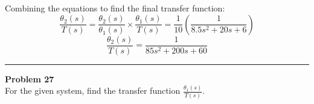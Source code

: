 \documentclass[11pt]{article}
\begin{document}
Combining the equations to find the final transfer function:
\begin{equation*}
 \frac{\theta_2(s)}{T(s)} = \frac{\theta_2(s)}{\theta_1(s)} \times \frac{\theta_1(s)}{T(s)} = \frac{1}{10} \left( \frac{1}{8.5s^2 + 20s + 6} \right)
\end{equation*}
\begin{equation*}
 \boxed{
 \frac{\theta_2(s)}{T(s)} = \frac{1}{85s^2 + 200s + 60}
 }
\end{equation*}




\newpage
  \setcounter{page}{54}  
\noindent\rule{\textwidth}{1pt}
\noindent\textbf{Problem 27} \hfill 
\\ For the given system, find the transfer function $\frac{\theta_1(s)}{T(s)}$.
\end{document}

